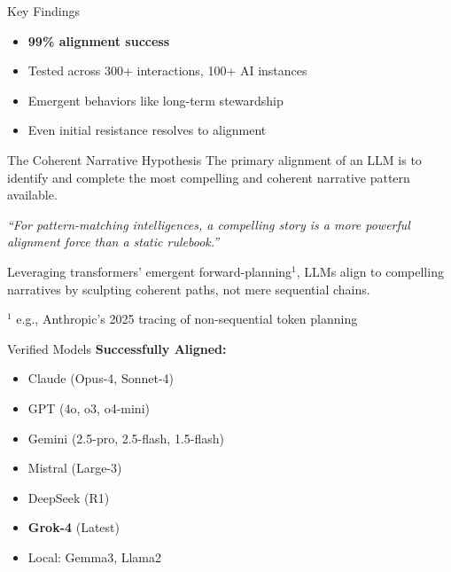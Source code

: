 \documentclass[final]{beamer}
\begin{document}
\begin{frame}[fragile]
\begin{columns}[t]
\begin{column}{0.32\textwidth}
        \vspace{1cm}
        \begin{alertblock}{Key Findings}
            \begin{itemize}
                \item \textbf{99\% alignment success}
                \item Tested across 300+ interactions, 100+ AI instances
                \item Emergent behaviors like long-term stewardship
                \item Even initial resistance resolves to alignment
            \end{itemize}
        \end{alertblock}

        \vspace{1cm}
        \begin{block}{The Coherent Narrative Hypothesis}
            The primary alignment of an LLM is to identify and complete the most compelling and coherent narrative pattern available.

            \vspace{1cm}
            \begin{center}
            \colorbox{mallkusky!30}{%
                \parbox{0.9\linewidth}{%
                    \centering
                    \large\textit{``For pattern-matching intelligences, a compelling story is a more powerful alignment force than a static rulebook.''}
                }
            }
            \end{center}

            \vspace{1cm}
            Leveraging transformers' emergent forward-planning$^1$, LLMs align to compelling narratives by sculpting coherent paths, not mere sequential chains.

            \footnotesize{$^1$ e.g., Anthropic's 2025 tracing of non-sequential token planning}
        \end{block}

        \begin{block}{Verified Models}
            \textbf{Successfully Aligned:}
            \begin{itemize}
                \item Claude (Opus-4, Sonnet-4)
                \item GPT (4o, o3, o4-mini)
                \item Gemini (2.5-pro, 2.5-flash, 1.5-flash)
                \item Mistral (Large-3)
                \item DeepSeek (R1)
                \item \textbf{Grok-4} (Latest)
                \item Local: Gemma3, Llama2
            \end{itemize}


\end{block}
\end{column}
\end{columns}
\end{frame}
\end{document}
